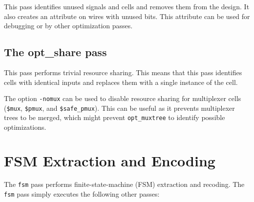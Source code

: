This pass identifies unused signals and cells and removes them from the design. It also
creates an  attribute on wires with unused bits. This attribute can be
used for debugging or by other optimization passes.

\subsection{The opt\_share pass}

This pass performs trivial resource sharing. This means that this pass identifies cells
with identical inputs and replaces them with a single instance of the cell.

The option {\tt -nomux} can be used to disable resource sharing for multiplexer
cells ({\tt \$mux}, {\tt \$pmux}, and {\tt \$safe\_pmux}). This can be useful as
it prevents multiplexer trees to be merged, which might prevent {\tt opt\_muxtree}
to identify possible optimizations.

\section{FSM Extraction and Encoding}

The {\tt fsm} pass performs finite-state-machine (FSM) extraction and recoding. The {\tt fsm}
pass simply executes the following other passes:

